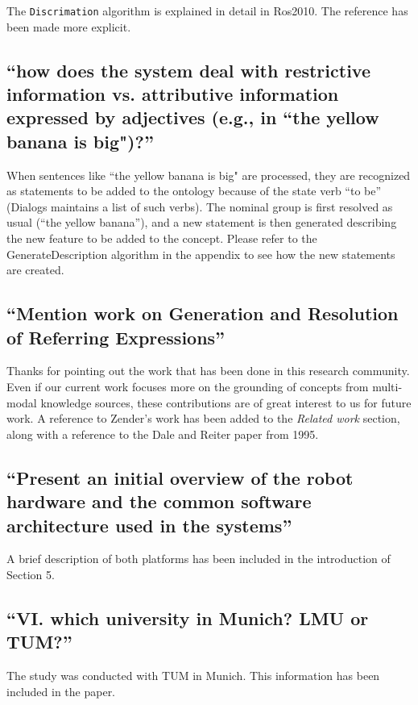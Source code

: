 \documentclass[11pt]{article}
\begin{document}
The {\tt Discrimation} algorithm is explained in detail in Ros2010. The
reference has been made more explicit.

\subsection{``how does the system deal with restrictive information vs.
attributive information expressed by adjectives (e.g., in ``the yellow banana is
big")?''}

When sentences like ``the yellow banana is big" are processed, they are
recognized as statements to be added to the ontology because of the state verb ``to be''
({\sc Dialogs} maintains a list of such verbs). The nominal group is first resolved as usual (``the yellow banana''), and a new statement is then generated describing the new feature to be added to the concept. Please refer to the {\sc GenerateDescription} algorithm in the appendix to see how the
new statements are created.

\subsection{``Mention work on Generation and Resolution of Referring Expressions''}

Thanks for pointing out the work that has been done in this research community.
Even if our current work focuses more on the grounding of concepts from 
multi-modal knowledge sources, these contributions are of great interest to us for future work.
A reference to Zender's work has been added to the \emph{Related work} 
section, along with a reference to the Dale and Reiter paper from 1995.

\subsection{``Present an initial overview of the
robot hardware and the common software architecture used in the systems''}

A brief description of both platforms has been included in the introduction of Section 5.

\subsection{``VI. which university in Munich? LMU or TUM?''}

The study was conducted with TUM in Munich. This information has been included in the paper.
\end{document}
